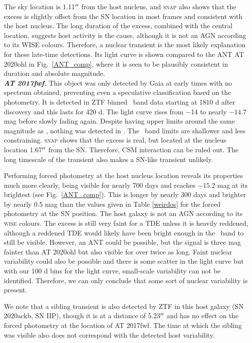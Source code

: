 \documentclass[a4paper,oneside,12pt, class=Latex/Classes/PhDthesisPSnPDF, crop=false]{standalone}
\begin{document}
The sky location is 1.11$^{\prime\prime}$ from the host nucleus, and \textsc{snap} also shows that the excess is slightly offset from the SN location in most frames and consistent with the host nucleus. The long duration of the excess, combined with the central location, suggests host activity is the cause, although it is not an AGN according to its WISE colours.  Therefore, a nuclear transient is the most likely explanation for these late-time detections. Its light curve is shown compared to the ANT AT 2020ohl in Fig.~\ref{ANT_comp}, where it is seen to be plausibly consistent in duration and absolute magnitude.\\


\textit{\textbf{AT 2017fwf.}}
This object was only detected by Gaia at early times with no spectrum obtained, preventing even a speculative classification based on the photometry. It is detected in ZTF binned \ztfr\ band data starting at 1810 d after discovery and this lasts for 420 d. The light curve rises from $-$14 to nearly $-14.7$ mag before slowly fading again. Despite having upper limits around the same magnitude as \ztfr, nothing was detected in \ztfg. The \ztfi\ band limits are shallower and less constraining. \textsc{snap} shows that the excess is real, but located at the nucleus location 1.67$^{\prime\prime}$ from the SN. Therefore, CSM interaction can be ruled out. The long timescale of the transient also makes a SN-like transient unlikely. 

Performing forced photometry at the host nucleus location reveals its properties much more clearly, being visible for nearly 700 days and reaches $-15.2$ mag at its brightest (see Fig.~\ref{ANT_comp}). This is longer by nearly 300 days and brighter by nearly 0.5 mag than the values given in Table \ref{weirdos} for the forced photometry at the SN position. The host galaxy is not an AGN according to its \textsc{wise} colours. The excess is still very faint for a TDE unless it is heavily reddened, although a reddened TDE would likely have been bright enough in the \ztfi\ band to still be visible. However, an ANT could be possible, but the signal is three mag fainter than AT 2020ohl but also visible for over twice as long. Faint nuclear variability could also be possible and there is some scatter in the light curve but with our 100 d bins for the light curve, small-scale variability can not be identified. Therefore, we can only conclude that some sort of nuclear variability is present. 

We note that a sibling transient is also detected by ZTF in this host galaxy (SN 2020ackb, SN IIP), though it is at a distance of 5.23$^{\prime\prime}$ and has no effect on the forced photometry at the location of AT 2017fwf. The time at which the sibling was visible also does not correspond with the detected host variability.\\
\end{document}
